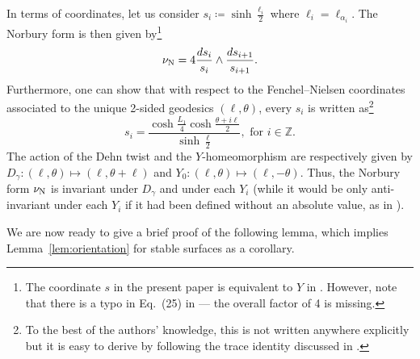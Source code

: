 \documentclass[12pt]{amsart}
\theoremstyle{plain}
\theoremstyle{definition}
\theoremstyle{remark}
\numberwithin{equation}{section}
\begin{document}
In terms of coordinates, let us consider $s_i\coloneqq\sinh\frac{\ell_{i}}{2}$ where $\ell_i=\ell_{\alpha_i}$. The Norbury form is then given by\footnote{The coordinate $s$ in the present paper is equivalent to $Y$ in \cite{Nor07}. However, note that there is a typo in Eq.~(25) in \cite{Nor07} --- the overall factor of 4 is missing.}
\begin{equation*}
    \nu_{{\rm N}}=4\frac{ds_i}{s_i}\wedge\frac{ds_{i+1}}{s_{i+1}}.
\end{equation*}
Furthermore, one can show that with respect to the Fenchel--Nielsen coordinates associated to the unique 2-sided geodesics $(\ell,\theta)$, every $s_i$ is written as\footnote{To the best of the authors' knowledge, this is not written anywhere explicitly but it is easy to derive by following the trace identity discussed in \cite[Section 3]{Nor07}.}
\begin{equation*}
    s_i=\frac{\cosh\frac{L_1}{4}\cosh\frac{\theta+i\ell}{2}}{\sinh\frac{\ell}{2}}, \text{ for } i\in\mathbb{Z}.
\end{equation*}
The action of the Dehn twist and the $Y$-homeomorphism are respectively given by $D_\gamma:(\ell,\theta)\mapsto(\ell,\theta+\ell)$ and $Y_0:(\ell,\theta)\mapsto(\ell,-\theta)$. Thus, the Norbury form $\nu_{{\rm N}}$ is invariant under $D_\gamma$ and under each $Y_i$ (while it would be only anti-invariant under each $Y_i$ if it had been defined without an absolute value, as in \cite{Nor07}). 

We are now ready to give a brief proof of the following lemma, which implies Lemma~\ref{lem:orientation} for stable surfaces as a corollary.
\end{document}
